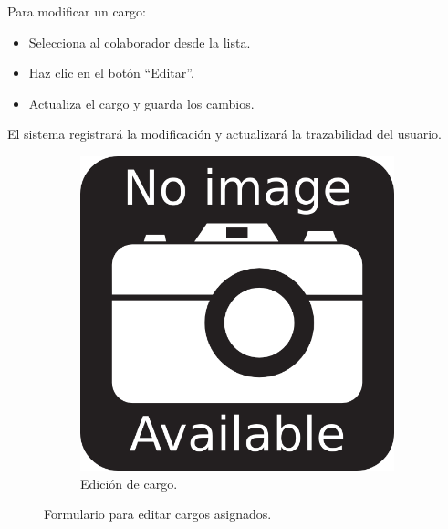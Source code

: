 Para modificar un cargo:

\begin{itemize}
    \item Selecciona al colaborador desde la lista.
    \item Haz clic en el botón “Editar”.
    \item Actualiza el cargo y guarda los cambios.
\end{itemize}

El sistema registrará la modificación y actualizará la trazabilidad del usuario.

\begin{figure}[h]
\centering
\begin{subfigure}{0.4\textwidth}
    \includegraphics[width=\textwidth]{imgs/no-image.png}
    \caption{Edición de cargo.}
    \label{fig:cargos3}
\end{subfigure}
\caption{Formulario para editar cargos asignados.}
\end{figure}